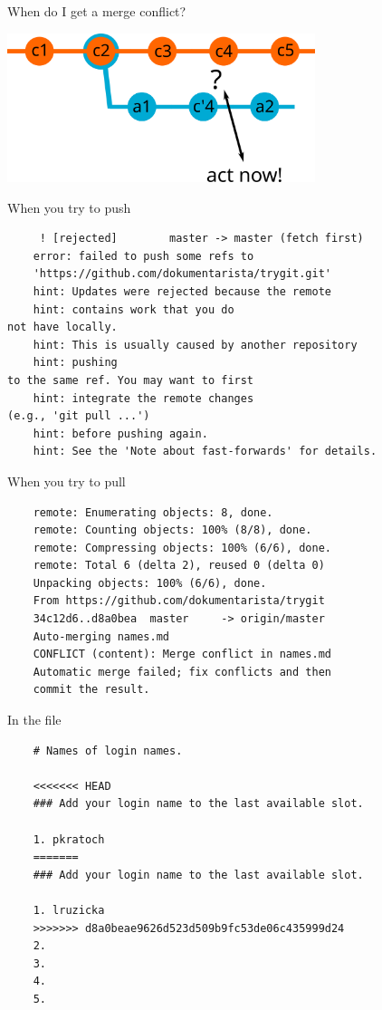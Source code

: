 \documentclass[14pt]{beamer}
\begin{document}
	\begin{frame}{When do I get a merge conflict?}
	\begin{center}
		\includegraphics[width=9cm]{conflict.png}
	\end{center}
	\end{frame}


	\begin{frame}[fragile]{When you try to push}
	\begin{verbatim}
	 ! [rejected]        master -> master (fetch first)
	error: failed to push some refs to 
	'https://github.com/dokumentarista/trygit.git'
	hint: Updates were rejected because the remote 
	hint: contains work that you do
not have locally. 
	hint: This is usually caused by another repository 
	hint: pushing
to the same ref. You may want to first 
	hint: integrate the remote changes
(e.g., 'git pull ...')
	hint: before pushing again.
	hint: See the 'Note about fast-forwards' for details.
	\end{verbatim}
	\end{frame}

	\begin{frame}[fragile]{When you try to pull}
	\begin{verbatim}
	remote: Enumerating objects: 8, done.
	remote: Counting objects: 100% (8/8), done.
	remote: Compressing objects: 100% (6/6), done.
	remote: Total 6 (delta 2), reused 0 (delta 0) 
	Unpacking objects: 100% (6/6), done.
	From https://github.com/dokumentarista/trygit
	34c12d6..d8a0bea  master     -> origin/master
	Auto-merging names.md
	CONFLICT (content): Merge conflict in names.md
	Automatic merge failed; fix conflicts and then 
	commit the result.
	\end{verbatim}
\end{frame}

	\begin{frame}[fragile]{In the file}
	\begin{verbatim}
	# Names of login names.
	
	<<<<<<< HEAD                                                                                                           
	### Add your login name to the last available slot.
	
	1. pkratoch
	=======
	### Add your login name to the last available slot.
	
	1. lruzicka
	>>>>>>> d8a0beae9626d523d509b9fc53de06c435999d24
	2.
	3.
	4.
	5.
	\end{verbatim}
	\end{frame}
\end{document}
